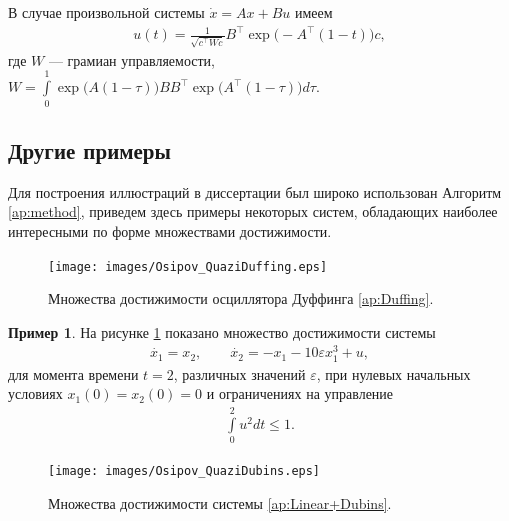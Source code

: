 \documentclass[../main.tex]{subfiles}
\begin{document}
  В случае произвольной системы $\dot{x} =Ax + Bu$ имеем
  \begin{gather*}
  	u(t) = \frac{1}{\sqrt{c^{\top}Wc}} B^{\top} \operatorname{exp}\big(-A^{\top}(1-t)\big) c,
  \end{gather*}
  где $W$ --- грамиан управляемости, $W  = \int\limits_{0}^{1}  \operatorname{exp}\big(A(1-\tau)\big) B B^{\top}  \operatorname{exp}\big(A^{\top}(1-\tau)\big) d\tau$.
  
  \subsection{Другие примеры}
  
  Для построения иллюстраций в диссертации был широко использован Алгоритм \ref{ap:method}, приведем здесь примеры некоторых систем, обладающих наиболее интересными по форме множествами достижимости.
  
   \begin{figure}[t]
   	\centering
   	\texttt{[image: images/Osipov\_QuaziDuffing.eps]}
   	\caption{Множества достижимости осциллятора Дуффинга \eqref{ap:Duffing}.}
   	\label{ap:fig:Duffing}
   \end{figure}
   
   \textbf{Пример 1}. На рисунке \ref{ap:fig:Duffing} показано множество достижимости системы 
   \begin{gather}\label{ap:Duffing}
   	\dot{x_1} = x_2, \qquad
   	\dot{x_2} = -x_1 - 10 \varepsilon x_1^3 + u ,
   \end{gather}
   для момента времени $t = 2$, различных значений $\varepsilon$, при нулевых начальных условиях $x_1(0) = x_2(0) = 0 $ и ограничениях на управление 
   \begin{gather}\label{ap:Duffing_controls}
   	\int\limits_0^2u^2dt \leqslant 1.
   \end{gather}
   
   \begin{figure}[ht]
   	\centering
   		\texttt{[image: images/Osipov\_QuaziDubins.eps]}
   	\caption{Множества достижимости системы \eqref{ap:Linear+Dubins}.}
   	\label{ap:fig:LinearDubins}
   	   \end{figure}
   	   
\end{document}
